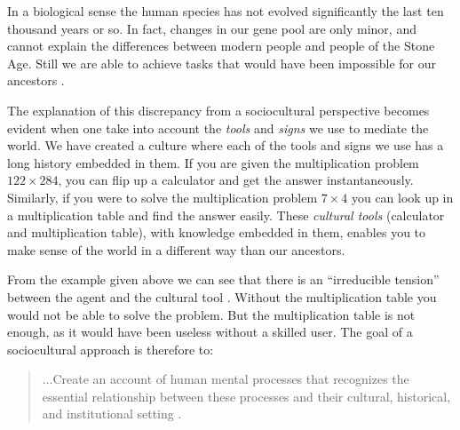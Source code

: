 

In a biological sense the human species has not evolved significantly the last ten thousand years or so. In fact, changes in our gene pool are only minor, and cannot explain the differences between modern people and people of the Stone Age. Still we are able to achieve tasks that would have been impossible for our ancestors \citep{saljo2001laering}.

The explanation of this discrepancy from a sociocultural perspective becomes evident when one take into account the \emph{tools} and \emph{signs} we use to mediate the world. We have created a culture where each of the tools and signs we use has a long history embedded in them. If you are given the multiplication problem \ensuremath{122\times284}, you can flip up a calculator and get the answer instantaneously. Similarly, if you were to solve the multiplication problem \ensuremath{7\times4} you can look up in a multiplication table and find the answer easily. These \emph{cultural tools} (calculator and multiplication table), with knowledge embedded in them, enables you to make sense of the world in a different way than our ancestors. 

From the example given above we can see that there is an “irreducible tension” between the agent and the cultural tool \citep{wertsch1998mind}. Without the multiplication table you would not be able to solve the problem. But the multiplication table is not enough, as it would have been useless without a skilled user. The goal of a sociocultural approach is therefore to: 

\begin{quote}
...Create an account of human mental processes that recognizes the essential relationship between these processes and their cultural, historical, and institutional setting \citep[p. 6]{wertsch1991voices}. 
\end{quote}

